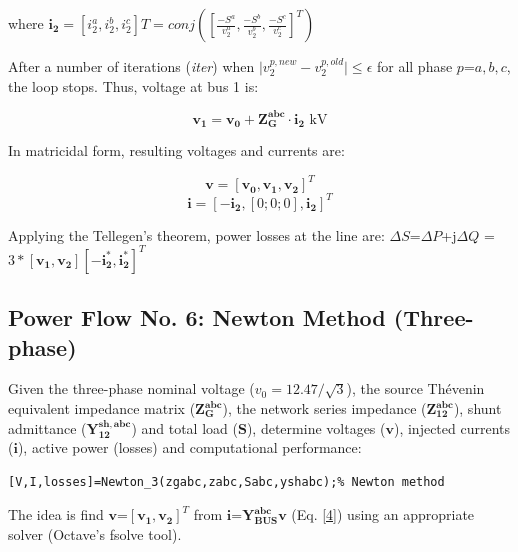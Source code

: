 \documentclass[12pt]{article}
\begin{document}
where $\bm{i_2}=[i^a_2, i^b_2,i^c_2]T=conj([\frac{-{S^a}}{{v}^a_2},\frac{-{S^b}}{{v}^b_2},\frac{-{S^c}}{{v}^c_2}]^T)$

After a number of iterations (\textit{iter}) when $\mid{v}^{p,new}_2-{v}^{p, old}_2\mid\leq \epsilon$ for all phase $p$=$a,b,c$, the loop stops. Thus, voltage at bus 1 is:

\begin{equation}
  \bm{v_1}=\bm{v_0}+\mathbf{{Z}^{abc}_{G}}\cdot \bm{i_2}\mbox{ kV}
\end{equation}

In matricidal form, resulting voltages and currents are:

\begin{equation}
  \bm{v}=[\bm{v_0}, \bm{v_1},\bm{v_2}]^T
\end{equation}
\begin{equation}
  \bm{i}=[-\bm{i_2},[0;0;0],\bm{i_2}]^T
\end{equation}

Applying the Tellegen's theorem, power losses at the line are: $\Delta {S}$=$\Delta P$+j$\Delta Q$
=$3*[\bm{v_1},\bm{v_2}][-\bm{i^*_2},\bm{i^*_2}]^T$

\subsection{Power Flow No. 6: Newton Method (Three-phase)}

Given the three-phase nominal voltage ($v_0=12.47/\sqrt{3}$), the source Th\'evenin equivalent impedance matrix ($\mathbf{{Z}^{abc}_{G}}$), the network series impedance ($\mathbf{{Z}^{abc}_{12}}$), shunt admittance ($\mathbf{{Y}^{sh,abc}_{12}}$) and total load ($\bm{S}$),
determine voltages ($\bm{v}$), injected currents ($\mathbf{i}$), active power (losses) and computational performance:

\begin{verbatim}
[V,I,losses]=Newton_3(zgabc,zabc,Sabc,yshabc);% Newton method
\end{verbatim}

The idea is find $\bm{v}$=$[\bm{v_1},\bm{v_2}]^T$ from $\bm{i}$=$\mathbf{Y^{abc}_{BUS}}\bm{v}$ (Eq. \ref{4}) using an appropriate solver (Octave's {fsolve} tool).
\end{document}
